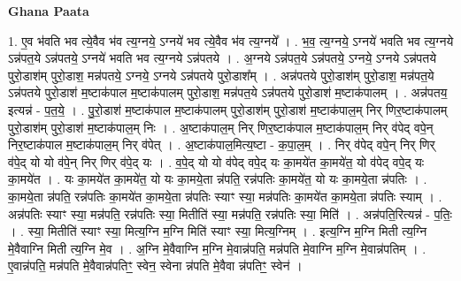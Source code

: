 \documentclass[17pt]{extarticle}
\begin{document}
\textbf{Ghana Paata } \newline

1. ए॒व भ॑वति भव त्ये॒वैव भ॑व त्य॒ग्नये॒ ऽग्नये॑ भव त्ये॒वैव भ॑व त्य॒ग्नये᳚ । . भ॒व॒ त्य॒ग्नये॒ ऽग्नये॑ भवति भव त्य॒ग्नये ऽन्न॑पत॒ये ऽन्न॑पतये॒ ऽग्नये॑ भवति भव त्य॒ग्नये ऽन्न॑पतये । . अ॒ग्नये ऽन्न॑पत॒ये ऽन्न॑पतये॒ ऽग्नये॒ ऽग्नये ऽन्न॑पतये पुरो॒डाश॑म् पुरो॒डाश॒ मन्न॑पतये॒ ऽग्नये॒ ऽग्नये ऽन्न॑पतये पुरो॒डाश᳚म् । . अन्न॑पतये पुरो॒डाश॑म् पुरो॒डाश॒ मन्न॑पत॒ये ऽन्न॑पतये पुरो॒डाश॑ म॒ष्टाक॑पाल म॒ष्टाक॑पालम् पुरो॒डाश॒ मन्न॑पत॒ये ऽन्न॑पतये पुरो॒डाश॑ म॒ष्टाक॑पालम् । . अन्न॑पतय॒ इत्यन्न॑ - प॒त॒ये॒ । . पु॒रो॒डाश॑ म॒ष्टाक॑पाल म॒ष्टाक॑पालम् पुरो॒डाश॑म् पुरो॒डाश॑ म॒ष्टाक॑पाल॒म् निर् णिर॒ष्टाक॑पालम् पुरो॒डाश॑म् पुरो॒डाश॑ म॒ष्टाक॑पाल॒म् निः । . अ॒ष्टाक॑पाल॒म् निर् णिर॒ष्टाक॑पाल म॒ष्टाक॑पाल॒म् निर् व॑पेद् वपे॒न् निर॒ष्टाक॑पाल म॒ष्टाक॑पाल॒म् निर् व॑पेत् । . अ॒ष्टाक॑पाल॒मित्य॒ष्टा - क॒पा॒ल॒म् । . निर् व॑पेद् वपे॒न् निर् णिर् व॑पे॒द् यो यो व॑पे॒न् निर् णिर् व॑पे॒द् यः । . व॒पे॒द् यो यो व॑पेद् वपे॒द् यः का॒मये॑त का॒मये॑त॒ यो व॑पेद् वपे॒द् यः का॒मये॑त । . यः का॒मये॑त का॒मये॑त॒ यो यः का॒मये॒ता न्न॑पति॒ रन्न॑पतिः का॒मये॑त॒ यो यः का॒मये॒ता न्न॑पतिः । . का॒मये॒ता न्न॑पति॒ रन्न॑पतिः का॒मये॑त का॒मये॒ता न्न॑पतिः स्याꣳ स्या॒ मन्न॑पतिः का॒मये॑त का॒मये॒ता न्न॑पतिः स्याम् । . अन्न॑पतिः स्याꣳ स्या॒ मन्न॑पति॒ रन्न॑पतिः स्या॒ मितीति॑ स्या॒ मन्न॑पति॒ रन्न॑पतिः स्या॒ मिति॑ । . अन्न॑पति॒रित्यन्न॑ - प॒तिः॒ । . स्या॒ मितीति॑ स्याꣳ स्या॒ मित्य॒ग्नि म॒ग्नि मिति॑ स्याꣳ स्या॒ मित्य॒ग्निम् । . इत्य॒ग्नि म॒ग्नि मिती त्य॒ग्नि मे॒वैवाग्नि मिती त्य॒ग्नि मे॒व । . अ॒ग्नि मे॒वैवाग्नि म॒ग्नि मे॒वान्न॑पति॒ मन्न॑पति मे॒वाग्नि म॒ग्नि मे॒वान्न॑पतिम् । . ए॒वान्न॑पति॒ मन्न॑पति मे॒वैवान्न॑पतिꣳ॒॒ स्वेन॒ स्वेना न्न॑पति मे॒वैवा न्न॑पतिꣳ॒॒ स्वेन॑ । \newline
\end{document}
